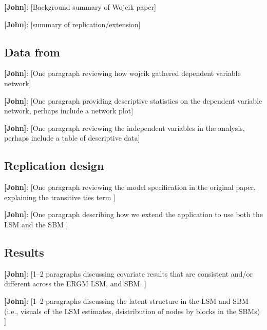 \documentclass[fleqn,12pt]{wlscirep}
\begin{document}
{\bf [John]}: [Background summary of Wojcik paper] 

{\bf [John]}: [summary of replication/extension]

\subsection{Data from \citet{wojcik2017legislative}}
{\bf [John]}: [One paragraph reviewing how wojcik gathered dependent variable network] 

{\bf [John]}: [One paragraph providing descriptive statistics on the dependent variable network, perhaps include a network plot]

 {\bf [John]}: [One paragraph reviewing the independent variables in the analysis, perhaps include a table of descriptive data]

\subsection{Replication design}

 {\bf [John]}: [One paragraph reviewing the model specification in the original paper, explaining the transitive ties term ]

 {\bf [John]}: [One paragraph describing how we extend the application to use both the LSM and the SBM ]


\subsection{Results}

 {\bf [John]}: [1--2 paragraphs discussing covariate results that are consistent and/or different across the ERGM LSM, and SBM. ]

 {\bf [John]}: [1--2 paragraphs discussing the latent structure in the LSM and SBM (i.e., visuals of the LSM estimates, dsistribution of nodes by blocks in the SBMs) ]
\end{document}
